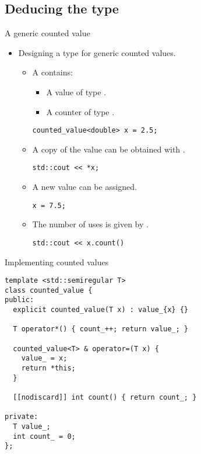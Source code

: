 \subsection{Deducing the type}

\begin{frame}[t,fragile]{A generic counted value}
\begin{itemize}
  \item Designing a type for generic counted values.
    \begin{itemize}
      \item A  contains:
        \begin{itemize}
          \item A value of type .
          \item A counter of type .
        \end{itemize}
\begin{lstlisting}
counted_value<double> x = 2.5;
\end{lstlisting}

      \item A copy of the value can be obtained with .
\begin{lstlisting}
std::cout << *x;
\end{lstlisting}

      \item A new value can be assigned.
\begin{lstlisting}
x = 7.5;
\end{lstlisting}

      \item The number of uses is given by .
\begin{lstlisting}
std::cout << x.count()
\end{lstlisting}
    \end{itemize}
\end{itemize}
\end{frame}

\begin{frame}[t,fragile]
\begin{block}{Implementing counted values}
\begin{lstlisting}
template <std::semiregular T>
class counted_value {
public:
  explicit counted_value(T x) : value_{x} {}

  T operator*() { count_++; return value_; }

  counted_value<T> & operator=(T x) {
    value_ = x;
    return *this;
  }

  [[nodiscard]] int count() { return count_; }

private:
  T value_;
  int count_ = 0;
};
\end{lstlisting}
\end{block}
\end{frame}

